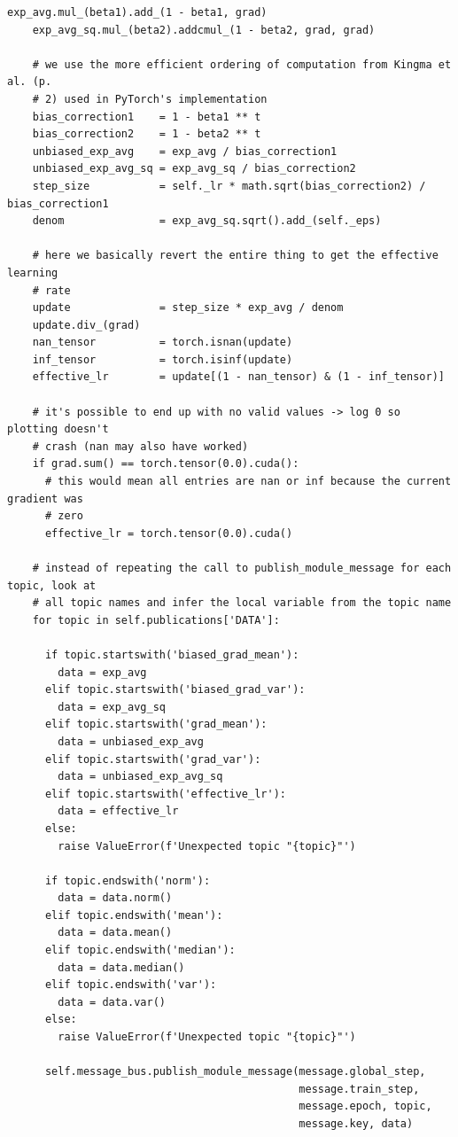 \begin{lstlisting}[label={lst:running_moments_sub},
caption={Subscriber to record Adam terms}]
    exp_avg.mul_(beta1).add_(1 - beta1, grad)
    exp_avg_sq.mul_(beta2).addcmul_(1 - beta2, grad, grad)

    # we use the more efficient ordering of computation from Kingma et al. (p.
    # 2) used in PyTorch's implementation
    bias_correction1    = 1 - beta1 ** t
    bias_correction2    = 1 - beta2 ** t
    unbiased_exp_avg    = exp_avg / bias_correction1
    unbiased_exp_avg_sq = exp_avg_sq / bias_correction2
    step_size           = self._lr * math.sqrt(bias_correction2) / bias_correction1
    denom               = exp_avg_sq.sqrt().add_(self._eps)

    # here we basically revert the entire thing to get the effective learning
    # rate
    update              = step_size * exp_avg / denom
    update.div_(grad)
    nan_tensor          = torch.isnan(update)
    inf_tensor          = torch.isinf(update)
    effective_lr        = update[(1 - nan_tensor) & (1 - inf_tensor)]

    # it's possible to end up with no valid values -> log 0 so plotting doesn't
    # crash (nan may also have worked)
    if grad.sum() == torch.tensor(0.0).cuda():
      # this would mean all entries are nan or inf because the current gradient was
      # zero
      effective_lr = torch.tensor(0.0).cuda()

    # instead of repeating the call to publish_module_message for each topic, look at
    # all topic names and infer the local variable from the topic name
    for topic in self.publications['DATA']:

      if topic.startswith('biased_grad_mean'):
        data = exp_avg
      elif topic.startswith('biased_grad_var'):
        data = exp_avg_sq
      elif topic.startswith('grad_mean'):
        data = unbiased_exp_avg
      elif topic.startswith('grad_var'):
        data = unbiased_exp_avg_sq
      elif topic.startswith('effective_lr'):
        data = effective_lr
      else:
        raise ValueError(f'Unexpected topic "{topic}"')

      if topic.endswith('norm'):
        data = data.norm()
      elif topic.endswith('mean'):
        data = data.mean()
      elif topic.endswith('median'):
        data = data.median()
      elif topic.endswith('var'):
        data = data.var()
      else:
        raise ValueError(f'Unexpected topic "{topic}"')

      self.message_bus.publish_module_message(message.global_step,
                                              message.train_step,
                                              message.epoch, topic,
                                              message.key, data)
\end{lstlisting}

